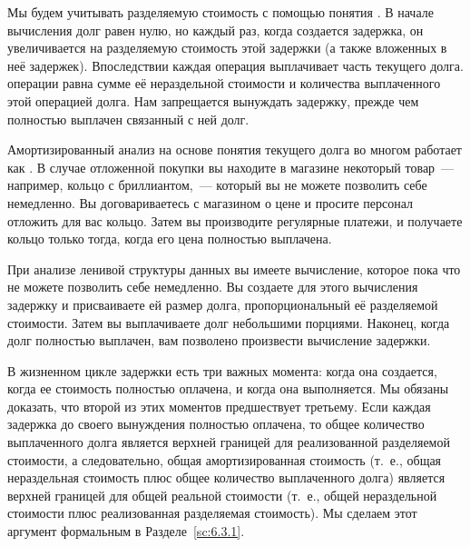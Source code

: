 Мы будем учитывать разделяемую стоимость с помощью понятия
.  В начале вычисления долг
равен нулю, но каждый раз, когда создается задержка, он увеличивается
на разделяемую стоимость этой задержки (а также вложенных в неё
задержек). Впоследствии каждая операция выплачивает часть текущего
долга.  операции
равна сумме её нераздельной стоимости и количества выплаченного этой
операцией долга. Нам запрещается вынуждать задержку, прежде чем
полностью выплачен связанный с ней долг.

\begin{remark}
  Амортизированный анализ на основе понятия текущего долга во многом
  работает как . В случае
  отложенной покупки вы находите в магазине некоторый товар~---
  например, кольцо с бриллиантом,~--- который вы не можете позволить себе
  немедленно. Вы договариваетесь с магазином о цене и просите персонал
  отложить для вас кольцо. Затем вы производите регулярные платежи, и
  получаете кольцо только тогда, когда его цена полностью выплачена.

  При анализе ленивой структуры данных вы имеете вычисление, которое
  пока что не можете позволить себе немедленно. Вы создаете для этого
  вычисления задержку и присваиваете ей размер долга, пропорциональный
  её разделяемой стоимости. Затем вы выплачиваете долг небольшими
  порциями. Наконец, когда долг полностью выплачен, вам позволено
  произвести вычисление задержки.
\end{remark}

В жизненном цикле задержки есть три важных момента: когда она
создается, когда ее стоимость полностью оплачена, и когда она
выполняется. Мы обязаны доказать, что второй из этих моментов
предшествует третьему.  Если каждая задержка до своего вынуждения
полностью оплачена, то общее количество выплаченного долга является
верхней границей для реализованной разделяемой стоимости, а
следовательно, общая амортизированная стоимость (т.~е., общая
нераздельная стоимость плюс общее количество выплаченного долга)
является верхней границей для общей реальной стоимости (т.~е., общей
нераздельной стоимости плюс реализованная разделяемая стоимость). Мы
сделаем этот аргумент формальным в Разделе~\ref{sc:6.3.1}.


